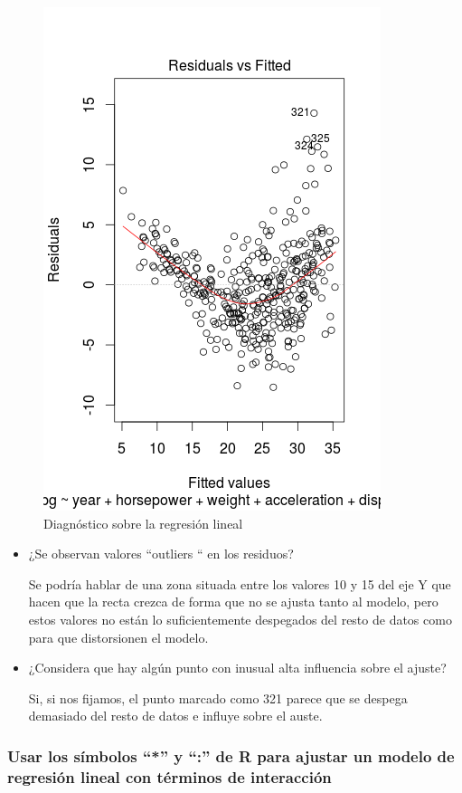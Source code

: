 \begin{figure}[H]
\centering
\includegraphics[scale=.60]{regmulej3.png}
\caption{Diagnóstico sobre la regresión lineal}
\label{}
\end{figure}

\begin{itemize}

\item ¿Se observan valores “outliers “ en los residuos?

Se podría hablar de una zona situada entre los valores 10 y 15 del eje Y que hacen que la recta crezca de forma que no se ajusta tanto al modelo, pero estos valores no están lo suficientemente despegados del resto de datos como para que distorsionen el modelo.

\item ¿Considera que hay algún punto con inusual alta influencia sobre el ajuste?

Si, si nos fijamos, el punto marcado como 321 parece que se despega demasiado del resto de datos e influye sobre el auste.

\end{itemize}


\subsubsection{Usar los símbolos “*” y “:” de R para ajustar un modelo de regresión lineal con términos de interacción}

